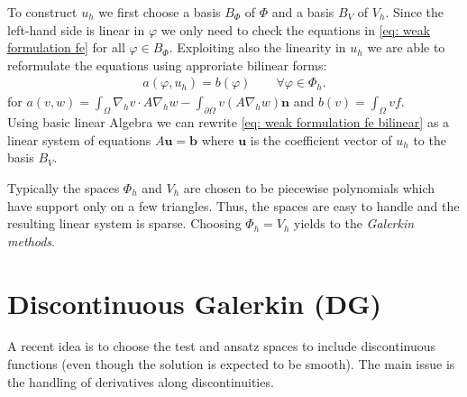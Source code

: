 To construct $u_h$ we first choose a basis $B_{\Phi}$ of $\Phi$ and a basis $B_V$ of $V_h$.
Since the left-hand side is linear in $\varphi$ we only need to check the equations in \eqref{eq: weak formulation fe} for all $\varphi \in B_{\Phi}$. Exploiting also the linearity in $u_h$  we are able to reformulate the equations using approriate bilinear forms:
\begin{align}
	a(\varphi,u_h)  =b(\varphi) \qquad \forall \varphi \in \Phi_h. \label{eq: weak formulation fe bilinear}
\end{align}
for $a(v,w)= \int_\Omega \nabla_h v  \cdot A\nabla_h w -\int_{\partial \Omega} v (A\nabla_h w)\mathbf{n}$ and $b(v) = \int_\Omega v f$.\\
 Using basic linear Algebra we can rewrite \eqref{eq: weak formulation fe bilinear} as a linear system of equations $A \mathbf{u} = \mathbf{b}$ where  $\mathbf{u}$ is the coefficient vector of $u_h$ to the basis $B_V$.  

Typically the spaces $\Phi_h$ and $V_h$ are chosen to be piecewise polynomials which have support only on a few triangles. Thus, the spaces are easy to handle and the resulting linear system is sparse.
Choosing $\Phi_h = V_h$ yields to the \emph{Galerkin methods}.

\section{Discontinuous Galerkin (DG)} \label{sec: SIPG}
A recent idea is to choose the test and ansatz spaces to include discontinuous functions (even though the solution is expected to be smooth).
The main issue is the handling of derivatives along discontinuities.

